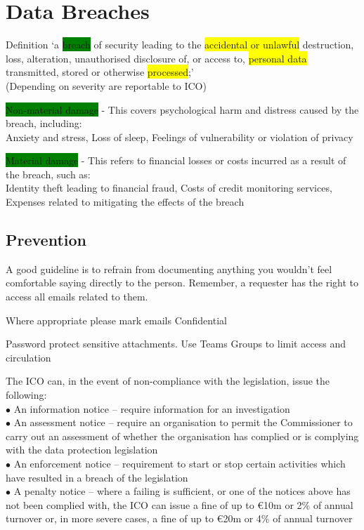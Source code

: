 \documentclass[tikz,border=10pt]{project_plan}
\newcommand{\bulletPoint}{\hspace{-3.1pt}$\bullet$ \hspace{5pt}}
\begin{document}
\section{Data Breaches}

Definition  ‘a \colorbox{green}{breach} of security leading to the \colorbox{yellow}{accidental or unlawful}
destruction, loss, alteration, unauthorised disclosure of, or access to,
\colorbox{yellow}{personal data} transmitted, stored or otherwise \colorbox{yellow}{processed};’\\
(Depending on severity are reportable to ICO)

\colorbox{green}{Non-material damage} - This covers psychological harm and distress caused by the breach, including:\\
Anxiety and stress, Loss of sleep, Feelings of vulnerability or violation of privacy

\colorbox{green}{Material damage} - This refers to financial losses or costs incurred as a result of the breach, such as:\\
Identity theft leading to financial fraud, Costs of credit monitoring services, Expenses related to mitigating the effects of the breach

\newpage

\subsection{Prevention}

A good guideline is to refrain from documenting anything you wouldn't feel comfortable saying directly to the person. Remember, a requester has the right to access all emails related to them.

Where appropriate please mark emails Confidential

Password protect sensitive attachments.  Use Teams Groups to limit access and circulation

The ICO can, in the event of non-compliance with the legislation, issue the following:\\
\bulletPoint An information notice – require information for an investigation\\
\bulletPoint An assessment notice – require an organisation to permit the Commissioner to carry out an assessment of whether the organisation has complied or is complying with the data protection legislation\\
\bulletPoint An enforcement notice – requirement to start or stop certain activities which have resulted in a breach of the legislation\\
\bulletPoint A penalty notice – where a failing is sufficient, or one of the notices above has not been complied with, the ICO can issue a fine of up to €10m or 2\% of annual turnover or, in more severe cases, a fine of up to €20m or 4\% of annual turnover
\end{document}
